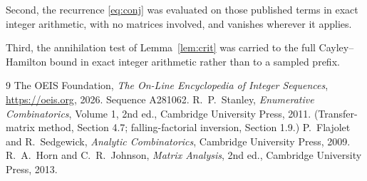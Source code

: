 \documentclass[11pt,a4paper]{article}
\theoremstyle{plain}
\theoremstyle{definition}
\begin{document}
Second, the recurrence \eqref{eq:conj} was evaluated on those published terms in exact
integer arithmetic, with no matrices involved, and vanishes wherever it applies.

Third, the annihilation test of Lemma~\ref{lem:crit} was carried to the full
Cayley--Hamilton bound in exact integer arithmetic rather than to a sampled prefix.

\begin{thebibliography}{9}
 The OEIS Foundation, \emph{The On-Line Encyclopedia of Integer
Sequences}, \url{https://oeis.org}, 2026. Sequence A281062.
 R.~P.~Stanley, \emph{Enumerative Combinatorics}, Volume 1, 2nd ed.,
Cambridge University Press, 2011. (Transfer-matrix method, Section 4.7; falling-factorial
inversion, Section 1.9.)
 P.~Flajolet and R.~Sedgewick, \emph{Analytic Combinatorics}, Cambridge
University Press, 2009.
 R.~A.~Horn and C.~R.~Johnson, \emph{Matrix Analysis}, 2nd ed., Cambridge
University Press, 2013.
\end{thebibliography}
\end{document}
